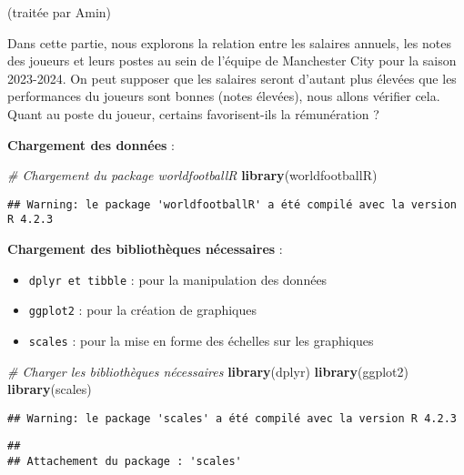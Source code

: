 \documentclass[
]{article}
\newenvironment{Shaded}{\begin{snugshade}}{\end{snugshade}}
\newcommand{\CommentTok}[1]{\textcolor[rgb]{0.56,0.35,0.01}{\textit{#1}}}
\newcommand{\FunctionTok}[1]{\textcolor[rgb]{0.13,0.29,0.53}{\textbf{#1}}}
\newcommand{\NormalTok}[1]{#1}
\providecommand{\tightlist}{%
  \setlength{\itemsep}{0pt}\setlength{\parskip}{0pt}}
\begin{document}
(traitée par Amin)

Dans cette partie, nous explorons la relation entre les salaires
annuels, les notes des joueurs et leurs postes au sein de l'équipe de
Manchester City pour la saison 2023-2024. On peut supposer que les
salaires seront d'autant plus élevées que les performances du joueurs
sont bonnes (notes élevées), nous allons vérifier cela. Quant au poste
du joueur, certains favorisent-ils la rémunération ?

\textbf{Chargement des données} :

\begin{Shaded}
\begin{Highlighting}[]
\CommentTok{\# Chargement du package worldfootballR}
\FunctionTok{library}\NormalTok{(worldfootballR)}
\end{Highlighting}
\end{Shaded}

\begin{verbatim}
## Warning: le package 'worldfootballR' a été compilé avec la version R 4.2.3
\end{verbatim}

\textbf{Chargement des bibliothèques nécessaires} :

\begin{itemize}
\tightlist
\item
  \texttt{dplyr\ et\ tibble} : pour la manipulation des données
\item
  \texttt{ggplot2} : pour la création de graphiques
\item
  \texttt{scales} : pour la mise en forme des échelles sur les
  graphiques
\end{itemize}

\begin{Shaded}
\begin{Highlighting}[]
\CommentTok{\# Charger les bibliothèques nécessaires}
\FunctionTok{library}\NormalTok{(dplyr)}
\FunctionTok{library}\NormalTok{(ggplot2)}
\FunctionTok{library}\NormalTok{(scales)}
\end{Highlighting}
\end{Shaded}

\begin{verbatim}
## Warning: le package 'scales' a été compilé avec la version R 4.2.3
\end{verbatim}

\begin{verbatim}
## 
## Attachement du package : 'scales'
\end{verbatim}
\end{document}
